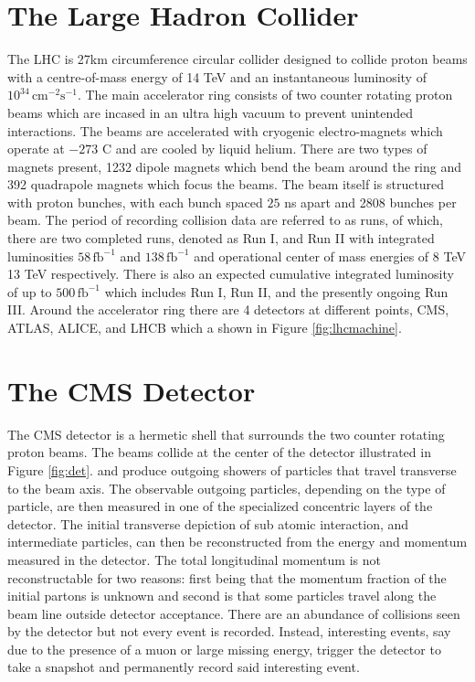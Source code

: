 \section{The Large Hadron Collider}
The LHC is 27km circumference circular collider designed to collide proton beams with a centre-of-mass energy of 14 TeV and an instantaneous luminosity of $10^{34} \, \text{cm}^{-2}\text{s}^{-1}$\cite{Evans:2008zzb}. The main accelerator ring consists of two counter rotating proton beams which are incased in an ultra high vacuum to prevent unintended interactions. The beams are accelerated with cryogenic electro-magnets which operate at $-273$ C and are cooled by liquid helium. There are two types of magnets present, 1232 dipole magnets which bend the beam around the ring and 392 quadrapole magnets which focus the beams.  The beam itself is structured with proton bunches, with each bunch spaced $25$ ns apart and 2808 bunches per beam. The period of recording collision data are referred to as runs, of which, there are two completed runs, denoted as Run I, and Run II with integrated luminosities $58 \, \text{fb}^{-1}$ and $138\, \text{fb}^{-1}$ and operational center of mass energies of 8 TeV 13 TeV respectively. There is also an expected cumulative integrated luminosity of up to $500 \,\text{fb}^{-1}$ which includes Run I, Run II, and the presently ongoing Run III. Around the accelerator ring there are 4 detectors at different points, CMS, ATLAS, ALICE, and LHCB which a shown in Figure \ref{fig:lhcmachine}.




\section{The CMS Detector}

The CMS detector is a hermetic shell that surrounds the two counter rotating proton beams. The beams collide at the center of the detector illustrated in Figure \ref{fig:det}. and produce outgoing showers of particles that travel transverse to the beam axis. The observable outgoing particles, depending on the type of particle, are then measured in one of the specialized concentric layers of the detector. The initial transverse depiction of sub atomic interaction, and intermediate particles, can then be reconstructed from the energy and momentum measured in the detector. The total longitudinal momentum is not reconstructable for two reasons: first being that the momentum fraction of the initial partons is unknown and second is that some particles travel along the beam line outside detector acceptance.  There are an abundance of collisions seen by the detector but not every event is recorded. Instead, interesting events, say due to the presence of a muon or large missing energy, trigger the detector to take a snapshot and permanently record said interesting event.

